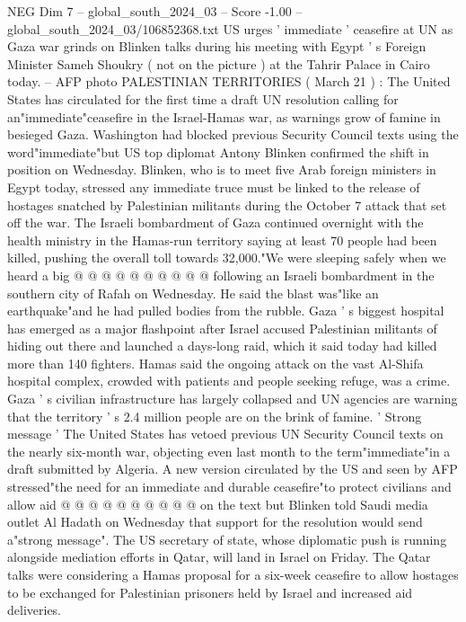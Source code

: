 \begin{textsample}{NEG Dim 7 – global\_south\_2024\_03 – Score -1.00 – global\_south\_2024\_03/106852368.txt}  \label{ex:f7_neg_291}
US urges ' immediate ' ceasefire at UN as Gaza war grinds on Blinken talks during his meeting with Egypt ' s Foreign Minister Sameh Shoukry ( not on the picture ) at the Tahrir Palace in Cairo today. -- AFP photo PALESTINIAN TERRITORIES ( March 21 ) : The United States has circulated for the first time a draft UN resolution calling for an"immediate"ceasefire in the Israel-Hamas war, as warnings grow of famine in besieged Gaza.
Washington had blocked previous Security Council texts using the word"immediate"but US top diplomat Antony Blinken confirmed the shift in position on Wednesday.
Blinken, who is to meet five Arab foreign ministers in Egypt today, stressed any immediate truce must be linked to the release of hostages snatched by Palestinian militants during the October 7 attack that set off the war.
The Israeli bombardment of Gaza continued overnight with the health ministry in the Hamas-run territory saying at least 70 people had been killed, pushing the overall toll towards 32,000."We were sleeping safely when we heard a big @ @ @ @ @ @ @ @ @ @ following an Israeli bombardment in the southern city of Rafah on Wednesday.
He said the blast was"like an earthquake"and he had pulled bodies from the rubble.
Gaza ' s biggest hospital has emerged as a major flashpoint after Israel accused Palestinian militants of hiding out there and launched a days-long raid, which it said today had killed more than 140 fighters.
Hamas said the ongoing attack on the vast Al-Shifa hospital complex, crowded with patients and people seeking refuge, was a crime.
Gaza ' s civilian infrastructure has largely collapsed and UN agencies are warning that the territory ' s 2.4 million people are on the brink of famine. ' Strong message ' The United States has vetoed previous UN Security Council texts on the nearly six-month war, objecting even last month to the term"immediate"in a draft submitted by Algeria.
A new version circulated by the US and seen by AFP stressed"the need for an immediate and durable ceasefire"to protect civilians and allow aid @ @ @ @ @ @ @ @ @ @ on the text but Blinken told Saudi media outlet Al Hadath on Wednesday that support for the resolution would send a"strong message".
The US secretary of state, whose diplomatic push is running alongside mediation efforts in Qatar, will land in Israel on Friday.
The Qatar talks were considering a Hamas proposal for a six-week ceasefire to allow hostages to be exchanged for Palestinian prisoners held by Israel and increased aid deliveries.

\end{textsample}
